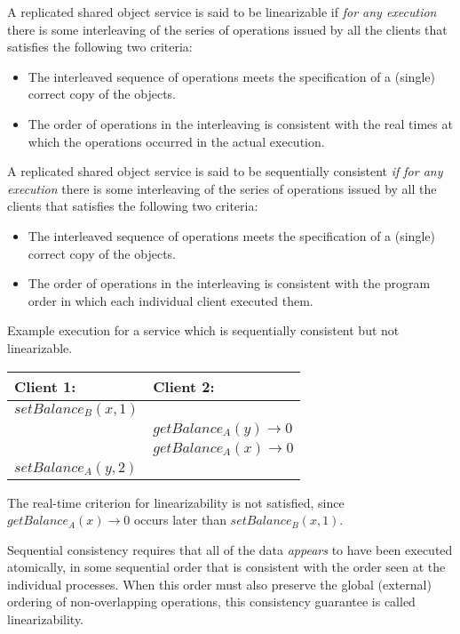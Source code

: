 \documentclass[a4paper]{article}
\newcommand{\solution}[2][]{
  \ifthenelse{\equal{#1}{} \or \equal{#1}{a}}{\\[3pt]\textit{Solution: }\\[0.1cm]}{}
  \parbox[t]{\textwidth}{
    \ifthenelse{\equal{#1}{}}{}{#1)}
    \parbox[t]{0.95\textwidth}{#2}}\\
}
\newcommand{\highlight}[1]{{\color{blue}#1}}
\begin{document}
\solution{
  A replicated shared object service is said to be
  \highlight{linearizable} if \textit{for any execution} there is
  some interleaving of the series of operations issued by all the
  clients that satisfies the following two criteria:
  \begin{itemize}
    \item The interleaved sequence of operations meets the
      specification of a (single) correct copy of the objects.
    \item The order of operations in the interleaving is consistent
      with the \highlight{real times at which the operations
        occurred in the actual execution.}
  \end{itemize}

  A replicated shared object service is said to be
  \highlight{sequentially consistent} \textit{if for any
    execution} there is some interleaving of the series of operations
  issued by all the clients that satisfies the following two criteria:
  \begin{itemize}
    \item The interleaved sequence of operations meets the
      specification of a (single) correct copy of the objects.
    \item The order of operations in the interleaving is consistent
      with the \highlight{program order in which each individual
        client executed them.}
  \end{itemize}

  \begin{center}
    Example execution for a service which is sequentially consistent
    but not linearizable.

    \begin{tabular}{| l | l |}\hline
      Client 1: & Client 2: \\\hline
      $setBalance_B(x, 1)$ &\\
      & $getBalance_A(y) \rightarrow 0$\\
      & $getBalance_A(x) \rightarrow 0$\\
      $setBalance_A(y, 2)$ &\\\hline
    \end{tabular}
    The real-time criterion for linearizability is not satisfied,
    since $getBalance_A(x) \rightarrow 0$ occurs later than
    $setBalance_B(x,1)$.\\
  \end{center}

  Sequential consistency requires that all of the data
  \textit{appears} to have been executed atomically, in some sequential
  order that is consistent with the order seen at the individual
  processes. When this order must also preserve the global (external)
  ordering of non-overlapping operations, this consistency guarantee is
  called linearizability.
}
\end{document}
